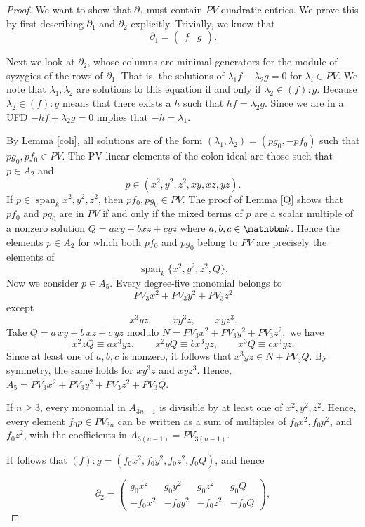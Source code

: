 \begin{proof}
We want to show that $\partial_3$ must contain $PV$-quadratic entries. We prove this by first describing $\partial_1$ and $\partial_2$ explicitly. Trivially, we know that
\[
\partial_1 =
\begin{pmatrix}
f & g
\end{pmatrix}.
\]

 Next we look at $\partial_2$, whose columns are  minimal generators for the module of syzygies of the rows of $\partial_1$. That is, the solutions of $\lambda_1f+\lambda_2g=0$ for $\lambda_i\in PV$. We note that $\lambda_1,\lambda_2$ are solutions to this equation if and only if $\lambda_2\in (f):g$. Because $\lambda_2\in (f):g$ means that there exists a $h$ such that $hf=\lambda_2g$. Since we are in a UFD $-hf+\lambda_2g=0$ implies that $-h=\lambda_1$.

 By Lemma \ref{coli}, all solutions are of the form $(\lambda_1,\lambda_2)=(pg_0,-pf_0)$ such that $pg_0,pf_0\in PV$. The PV-linear elements of the colon ideal are those such that $p\in A_2$ and 
 \[
p\in(x^2,y^2,z^2,xy,xz,yz).
\]
If $p\in\operatorname{span}_k{x^2,y^2,z^2}$, then $pf_0,pg_0\in PV$. The proof of Lemma \ref{Q} shows that $pf_0$ and $pg_0$ are in $PV$ if and only if the mixed terms of $p$ are a scalar multiple of a nonzero solution $Q=axy+bxz+cyz$ where $a,b,c\in \K$. Hence the elements $p\in A_2$ for which both $pf_0$ and $pg_0$
belong to $PV$ are precisely the elements of
\[
\operatorname{span}_k\{x^2,y^2,z^2,Q\}.
\]
 Now we consider $p\in A_5$. Every
degree-five monomial belongs to
\[
PV_3x^2+PV_3y^2+PV_3z^2
\]
except
\[
x^3yz,\qquad xy^3z,\qquad xyz^3.
\]
Take
$
Q=a\,xy+b\,xz+c\,yz
$
modulo
$
N=PV_3x^2+PV_3y^2+PV_3z^2,
$
we have
\[
x^2zQ\equiv a x^3yz,\qquad
x^2yQ\equiv b x^3yz,\qquad
x^3Q\equiv c x^3yz.
\]
Since at least one of $a,b,c$ is nonzero, it follows that $x^3yz\in N+PV_3Q$.
By symmetry, the same holds for $xy^3z$ and $xyz^3$. Hence, $A_5=PV_3x^2+PV_3y^2+PV_3z^2+PV_3Q$.

If $n\geq 3$, every monomial in $A_{3n-1}$ is divisible by at least one of $x^2,y^2,z^2$. Hence, every element $f_0p\in PV_{3n}$ can be written as a sum of multiples of $f_0x^2,f_0y^2$, and $f_0z^2$, with the coefficients in $A_{3(n-1)}=PV_{3(n-1)}$. 

It follows that $(f):g=(f_0x^2,f_0y^2,f_0z^2,f_0Q)$,
and hence 

\[
\partial_2 =
\begin{pmatrix}
g_0x^2 & g_0y^2 & g_0z^2 & g_0Q\\
-f_0x^2 & -f_0y^2 & -f_0z^2 & -f_0Q
\end{pmatrix},
\]


\end{proof}
